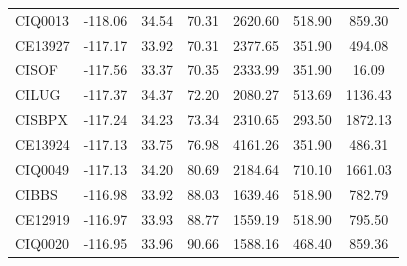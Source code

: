 \begin{table}[!ht]
{\begin{tabular}{@{}lcccccc@{}}
      CIQ0013   & -118.06           & 34.54             & 70.31           & 2620.60             & 518.90          & 859.30        \\
      CE13927   & -117.17           & 33.92             & 70.31           & 2377.65             & 351.90          & 494.08        \\
      CISOF     & -117.56           & 33.37             & 70.35           & 2333.99             & 351.90          & 16.09         \\
      CILUG     & -117.37           & 34.37             & 72.20           & 2080.27             & 513.69          & 1136.43       \\
      CISBPX    & -117.24           & 34.23             & 73.34           & 2310.65             & 293.50          & 1872.13       \\
      CE13924   & -117.13           & 33.75             & 76.98           & 4161.26             & 351.90          & 486.31        \\
      CIQ0049   & -117.13           & 34.20             & 80.69           & 2184.64             & 710.10          & 1661.03       \\
      CIBBS     & -116.98           & 33.92             & 88.03           & 1639.46             & 518.90          & 782.79        \\
      CE12919   & -116.97           & 33.93             & 88.77           & 1559.19             & 518.90          & 795.50        \\
      CIQ0020   & -116.95           & 33.96             & 90.66           & 1588.16             & 468.40          & 859.36        \\
      \bottomrule
    \end{tabular}}
\end{table}


